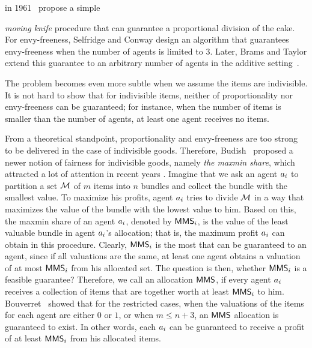 {\dubinsfirst} in 1961~\cite{Dubins:first} propose a simple {\emph{moving knife} procedure that can guarantee a proportional division of the cake. For envy-freeness, Selfridge and Conway design an algorithm that guarantees envy-freeness when the number of agents is limited to 3. Later, Brams and Taylor extend this guarantee to an arbitrary number of agents in the additive setting~\cite{brams}.

\begin{comment}
Despite the simplicity of the cake cutting problem
\end{comment}
The problem becomes even more subtle when we assume the items are indivisible. It is not hard to show that for indivisible items, neither of proportionality nor envy-freeness can be guaranteed; for instance, when the number of items is smaller than the number of agents, at least one agent receives no items. 


From a theoretical standpoint, proportionality and envy-freeness are too strong to be delivered in the case of indivisible goods. Therefore, Budish~\cite{Budish:first} proposed a newer notion of fairness for indivisible goods, namely \textit{the maxmin share}, which attracted a lot of attention in recent years \cite{Procaccia:first,amanatidis2015approximation,kurokawa2015can,Bouveret:first,caragiannis2016unreasonable,barman2017approximation,suksompong2017approximate,farhadi2017fair}. Imagine that we ask an agent $a_i$ to partition a set $\cal M$ of $m$ items into $n$ bundles and collect the bundle with the smallest value. To maximize his profits, agent $a_i$ tries to divide $\cal M$ in a way that maximizes the value of the bundle with the lowest value to him. Based on this, the maxmin share of an agent $a_i$, denoted by $\mathsf{MMS}_i$, is the value of the least valuable bundle in agent $a_i$'s allocation; that is, the maximum profit $a_i$ can obtain in this procedure. Clearly, $\mathsf{MMS}_i$ is the most that can be guaranteed to an agent, since if all valuations are the same, at least one agent obtains a valuation of at most $\mathsf{MMS}_i$ from his allocated set. The question is then, whether $\mathsf{MMS}_i$ is a feasible guarantee? Therefore, we call an allocation $\mathsf{MMS}$, if every agent $a_i$ receives a collection of items that are together worth at least $\mathsf{MMS}_i$ to him. Bouverret~\cite{Bouveret:first} showed that for the restricted cases, when the valuations of the items for each agent are either $0$ or $1$, or when $m \leq n+3$, an $\mathsf{MMS}$ allocation is guaranteed to exist. In other words, each $a_i$ can be guaranteed to receive a profit of at least $\mathsf{MMS}_i$ from his allocated items. 


}

